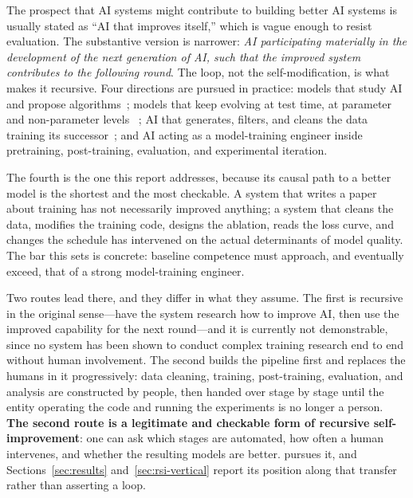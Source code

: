 The prospect that AI systems might contribute to building better AI systems is
usually stated as ``AI that improves itself,'' which is vague enough to resist
evaluation. The substantive version is narrower: \emph{AI participating materially in
the development of the next generation of AI, such that the improved system
contributes to the following round}. The loop, not the self-modification, is what
makes it recursive. Four directions are pursued in practice: models that study AI and
propose algorithms~\citep{lu2024aiscientist,novikov2025alphaevolve}; models that keep
evolving at test time, at parameter and non-parameter levels
~\citep{snell2024testtime}; AI that generates, filters, and cleans the data training
its successor~\citep{mitra2024agentinstruct}; and AI acting as a model-training
engineer inside pretraining, post-training, evaluation, and experimental iteration.

The fourth is the one this report addresses, because its causal path to a better
model is the shortest and the most checkable. A system that writes a paper about
training has not necessarily improved anything; a system that cleans the data,
modifies the training code, designs the ablation, reads the loss curve, and changes
the schedule has intervened on the actual determinants of model quality. The bar this
sets is concrete: baseline competence must approach, and eventually exceed, that of a
strong model-training engineer.

Two routes lead there, and they differ in what they assume. The first is recursive
in the original sense---have the system research how to improve AI, then use the
improved capability for the next round---and it is currently not demonstrable, since
no system has been shown to conduct complex training research end to end without
human involvement. The second builds the pipeline first and replaces the humans in it
progressively: data cleaning, training, post-training, evaluation, and analysis are
constructed by people, then handed over stage by stage until the entity operating the
code and running the experiments is no longer a person. \textbf{The second route is a
legitimate and checkable form of recursive self-improvement}: one can ask which
stages are automated, how often a human intervenes, and whether the resulting models
are better. \systemname{} pursues it, and Sections~\ref{sec:results}
and~\ref{sec:rsi-vertical} report its position along that transfer rather than
asserting a loop.

